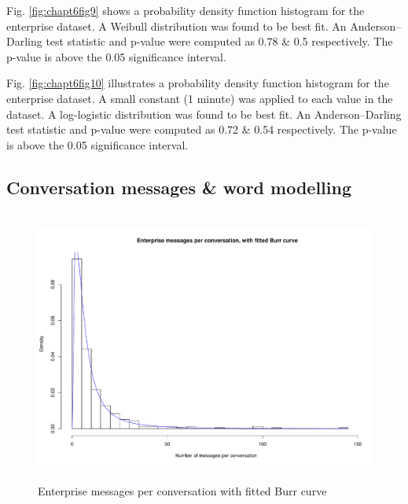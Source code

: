 Fig. \ref{fig:chapt6fig9} shows a probability density function histogram for the enterprise dataset. A  Weibull distribution was found to be best fit. An Anderson--Darling test statistic and p-value were computed as 0.78 \& 0.5 respectively. The p-value is above the 0.05 significance interval. 

Fig. \ref{fig:chapt6fig10} illustrates a probability density function histogram for the enterprise dataset. A small constant (1 minute) was applied to each value in the dataset. A log-logistic distribution was found to be best fit. An Anderson--Darling test statistic and p-value were computed as 0.72 \& 0.54 respectively. The p-value is above the 0.05 significance interval. 

\subsection{Conversation messages \& word modelling}

\begin{figure}
\begin{center}
\caption{Enterprise messages per conversation with fitted Burr curve}
\label{fig:chapt6fig11}
\includegraphics[height=9cm, width=13cm]{graphs/different/11_messages_enterprise.pdf} 
\end{center}
\end{figure}

